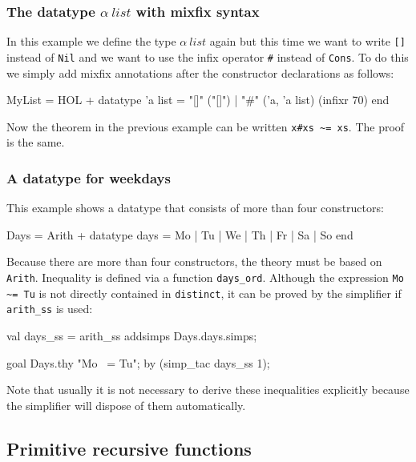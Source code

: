 \subsubsection{The datatype $\alpha~list$ with mixfix syntax}

In this example we define the type $\alpha~list$ again but this time we want
to write {\tt []} instead of {\tt Nil} and we want to use the infix operator
\verb|#| instead of {\tt Cons}. To do this we simply add mixfix annotations
after the constructor declarations as follows:
\begin{ttbox}
MyList = HOL +
  datatype 'a list = "[]" ("[]") 
                   | "#" ('a, 'a list) (infixr 70)
end
\end{ttbox}
Now the theorem in the previous example can be written \verb|x#xs ~= xs|. The
proof is the same.


\subsubsection{A datatype for weekdays}

This example shows a datatype that consists of more than four constructors:
\begin{ttbox}
Days = Arith +
  datatype days = Mo | Tu | We | Th | Fr | Sa | So
end
\end{ttbox}
Because there are more than four constructors, the theory must be based on
{\tt Arith}. Inequality is defined via a function \verb|days_ord|. Although
the expression \verb|Mo ~= Tu| is not directly contained in {\tt distinct},
it can be proved by the simplifier if \verb$arith_ss$ is used:
\begin{ttbox}
val days_ss = arith_ss addsimps Days.days.simps;

goal Days.thy "Mo ~= Tu";
by (simp_tac days_ss 1);
\end{ttbox}
Note that usually it is not necessary to derive these inequalities explicitly
because the simplifier will dispose of them automatically.

\subsection{Primitive recursive functions}


